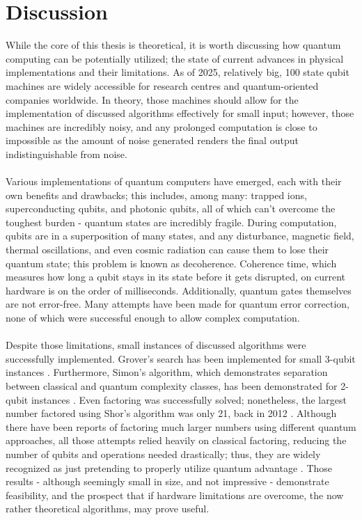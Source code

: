 \section{Discussion}
While the core of this thesis is theoretical, it is worth discussing how quantum computing can be potentially utilized; the state of current advances in physical implementations and their limitations. As of 2025, relatively big, 100 state qubit machines are widely accessible for research centres and quantum-oriented companies worldwide. In theory, those machines should allow for the implementation of discussed algorithms effectively for small input; however, those machines are incredibly noisy, and any prolonged computation is close to impossible as the amount of noise generated renders the final output indistinguishable from noise. \\\\
Various implementations of quantum computers have emerged, each with their own benefits and drawbacks; this includes, among many: trapped ions, superconducting qubits, and photonic qubits, all of which can't overcome the toughest burden - quantum states are incredibly fragile. During computation, qubits are in a superposition of many states, and any disturbance, magnetic field, thermal oscillations, and even cosmic radiation can cause them to lose their quantum state; this problem is known as decoherence. Coherence time, which measures how long a qubit stays in its state before it gets disrupted, on current hardware is on the order of milliseconds. Additionally, quantum gates themselves are not error-free. Many attempts have been made for quantum error correction, none of which were successful enough to allow complex computation.
\\\\
Despite those limitations, small instances of discussed algorithms were successfully implemented. Grover's search has been implemented for small 3-qubit instances \cite{Figgatt2017Grover}. Furthermore, Simon's algorithm, which demonstrates separation between classical and quantum complexity classes, has been demonstrated for 2-qubit instances \cite{Tame2014}. Even factoring was successfully solved; nonetheless, the largest number factored using Shor's algorithm was only 21, back in 2012 \cite{shor21}. Although there have been reports of factoring much larger numbers using different quantum approaches, all those attempts relied heavily on classical factoring, reducing the number of qubits and operations needed drastically; thus, they are widely recognized as just pretending to properly utilize quantum advantage \cite{Smolin_2013}. Those results - although seemingly small in size, and not impressive - demonstrate feasibility, and the prospect that if hardware limitations are overcome, the now rather theoretical algorithms, may prove useful.
